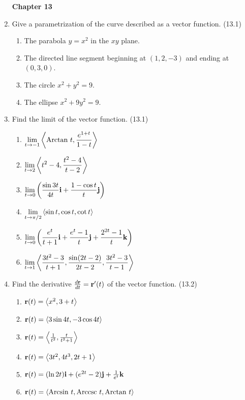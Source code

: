 \begin{enumerate}
\newpage
\centerline{\bf Chapter 13}

    \item Give a parametrization of the curve described as a vector function. (13.1)

      \begin{enumerate}
        \item The parabola $y=x^2$ in the $xy$ plane.
        \item The directed line segment beginning at $(1,2,-3)$ and ending at $(0,3,0)$.
        \item The circle $x^2+y^2=9$.
        \item The ellipse $x^2+9y^2=9$.
      \end{enumerate}

    \item Find the limit of the vector function. (13.1)

      \begin{enumerate}
        \item $\displaystyle\lim_{t\to -1} \left<\text{Arctan } t, \frac{e^{1+t}}{1-t}\right>$
        \item $\displaystyle\lim_{t\to 2} \left<t^2-4,\frac{t^2-4}{t-2}\right>$
        \item $\displaystyle\lim_{t\to 0} \left(\frac{\sin3t}{4t}\mathbf{i} + \frac{1-\cos t}{t}\mathbf{j}\right)$
        \item $\displaystyle\lim_{t\to \pi/2} \left<\sin t, \cos t, \cot t\right>$
        \item $\displaystyle\lim_{t\to 0} \left(\frac{e^t}{t+1}\mathbf{i}+\frac{e^{t}-1}{t}\mathbf{j}+\frac{2^{2t}-1}{t}\mathbf{k}\right)$
        \item $\displaystyle\lim_{t\to 1} \left<\frac{3t^2-3}{t+1}, \frac{\sin(2t-2)}{2t-2},\frac{3t^2-3}{t-1}\right>$
      \end{enumerate}

    \item Find the derivative $\frac{d\mathbf{r}}{dt}=\mathbf{r}'(t)$ of the vector function. (13.2)

      \begin{enumerate}
        \item $\mathbf{r}(t) = \left<x^2,3+t\right>$
        \item $\mathbf{r}(t) = \left<3\sin4t,-3\cos4t\right>$
        \item $\mathbf{r}(t) = \left<\frac{1}{t^2},\frac{t}{t^2+1}\right>$
        \item $\mathbf{r}(t) = \left<3t^2, 4t^3, 2t+1\right>$
        \item $\mathbf{r}(t) = (\ln 2t)\mathbf{i} + (e^{2t}-2)\mathbf{j} + \frac{1}{e^t}\mathbf{k}$
        \item $\mathbf{r}(t) = \left<\text{Arcsin } t, \text{Arccsc } t, \text{Arctan } t\right>$
      \end{enumerate}


\end{enumerate}
